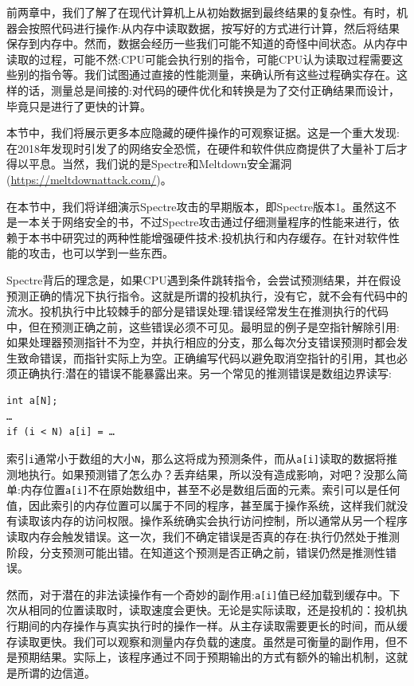 
前两章中，我们了解了在现代计算机上从初始数据到最终结果的复杂性。有时，机器会按照代码进行操作:从内存中读取数据，按写好的方式进行计算，然后将结果保存到内存中。然而，数据会经历一些我们可能不知道的奇怪中间状态。从内存中读取的过程，可能不然:CPU可能会执行别的指令，可能CPU认为读取过程需要这些别的指令等。我们试图通过直接的性能测量，来确认所有这些过程确实存在。这样的话，测量总是间接的:对代码的硬件优化和转换是为了交付正确结果而设计，毕竟只是进行了更快的计算。

本节中，我们将展示更多本应隐藏的硬件操作的可观察证据。这是一个重大发现:在2018年发现时引发了的网络安全恐慌，在硬件和软件供应商提供了大量补丁后才得以平息。当然，我们说的是Spectre和Meltdown安全漏洞(\url{https://meltdownattack.com/})。


在本节中，我们将详细演示Spectre攻击的早期版本，即Spectre版本1。虽然这不是一本关于网络安全的书，不过Spectre攻击通过仔细测量程序的性能来进行，依赖于本书中研究过的两种性能增强硬件技术:投机执行和内存缓存。在针对软件性能的攻击，也可以学到一些东西。

Spectre背后的理念是，如果CPU遇到条件跳转指令，会尝试预测结果，并在假设预测正确的情况下执行指令。这就是所谓的投机执行，没有它，就不会有代码中的流水。投机执行中比较棘手的部分是错误处理:错误经常发生在推测执行的代码中，但在预测正确之前，这些错误必须不可见。最明显的例子是空指针解除引用:如果处理器预测指针不为空，并执行相应的分支，那么每次分支错误预测时都会发生致命错误，而指针实际上为空。正确编写代码以避免取消空指针的引用，其也必须正确执行:潜在的错误不能暴露出来。另一个常见的推测错误是数组边界读写:

\begin{lstlisting}[style=styleCXX]
int a[N];
…
if (i < N) a[i] = …
\end{lstlisting}

索引\texttt{i}通常小于数组的大小\texttt{N}，那么这将成为预测条件，而从\texttt{a[i]}读取的数据将推测地执行。如果预测错了怎么办？丢弃结果，所以没有造成影响，对吧？没那么简单:内存位置\texttt{a[i]}不在原始数组中，甚至不必是数组后面的元素。索引可以是任何值，因此索引的内存位置可以属于不同的程序，甚至属于操作系统，这样我们就没有读取该内存的访问权限。操作系统确实会执行访问控制，所以通常从另一个程序读取内存会触发错误。这一次，我们不确定错误是否真的存在:执行仍然处于推测阶段，分支预测可能出错。在知道这个预测是否正确之前，错误仍然是推测性错误。

然而，对于潜在的非法读操作有一个奇妙的副作用:\texttt{a[i]}值已经加载到缓存中。下次从相同的位置读取时，读取速度会更快。无论是实际读取，还是投机的：投机执行期间的内存操作与真实执行时的操作一样。从主存读取需要更长的时间，而从缓存读取更快。我们可以观察和测量内存负载的速度。虽然是可衡量的副作用，但不是预期结果。实际上，该程序通过不同于预期输出的方式有额外的输出机制，这就是所谓的边信道。

